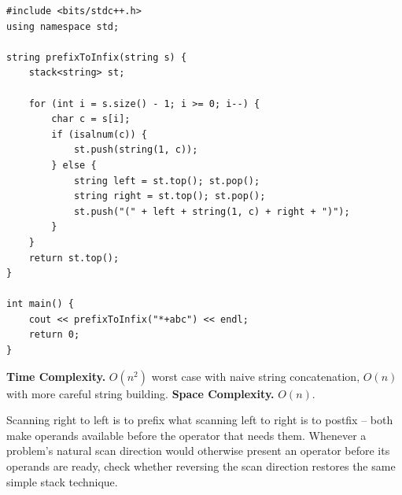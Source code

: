 \begin{lstlisting}
#include <bits/stdc++.h>
using namespace std;

string prefixToInfix(string s) {
    stack<string> st;

    for (int i = s.size() - 1; i >= 0; i--) {
        char c = s[i];
        if (isalnum(c)) {
            st.push(string(1, c));
        } else {
            string left = st.top(); st.pop();
            string right = st.top(); st.pop();
            st.push("(" + left + string(1, c) + right + ")");
        }
    }
    return st.top();
}

int main() {
    cout << prefixToInfix("*+abc") << endl;
    return 0;
}
\end{lstlisting}

\begin{complexitybox}
\textbf{Time Complexity.} $O(n^2)$ worst case with naive string
concatenation, $O(n)$ with more careful string building.
\textbf{Space Complexity.} $O(n)$.
\end{complexitybox}

\begin{takeawaybox}
Scanning right to left is to prefix what scanning left to right is to
postfix -- both make operands available before the operator that needs
them. Whenever a problem's natural scan direction would otherwise present
an operator before its operands are ready, check whether reversing the
scan direction restores the same simple stack technique.
\end{takeawaybox}
